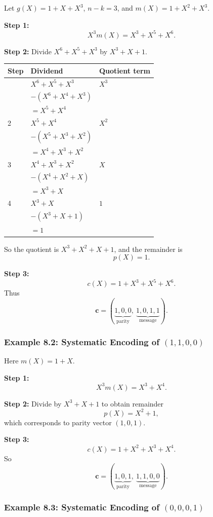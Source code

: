 \documentclass[
]{article}
\begin{document}
Let \(g(X)=1+X+X^3\), \(n-k=3\), and \(m(X)=1+X^2+X^3\).

\textbf{Step 1:} \[X^3m(X)=X^3+X^5+X^6.\]

\textbf{Step 2:} Divide \(X^6+X^5+X^3\) by \(X^3+X+1\).

\begin{longtable}[]{@{}lll@{}}
\toprule\noalign{}
Step & Dividend & Quotient term \\
\midrule\noalign{}
\endhead
\bottomrule\noalign{}
\endlastfoot
1 & \(X^6 + X^5 + X^3\) & \(X^3\) \\
& \(-(X^6 + X^4 + X^3)\) & \\
& \(= X^5 + X^4\) & \\
2 & \(X^5 + X^4\) & \(X^2\) \\
& \(-(X^5 + X^3 + X^2)\) & \\
& \(= X^4 + X^3 + X^2\) & \\
3 & \(X^4 + X^3 + X^2\) & \(X\) \\
& \(-(X^4 + X^2 + X)\) & \\
& \(= X^3 + X\) & \\
4 & \(X^3 + X\) & \(1\) \\
& \(-(X^3 + X + 1)\) & \\
& \(= 1\) & \\
\end{longtable}

So the quotient is \(X^3+X^2+X+1\), and the remainder is \[p(X)=1.\]

\textbf{Step 3:} \[c(X)=1+X^3+X^5+X^6.\] Thus
\[\mathbf{c}=(\underbrace{1,0,0}_{\text{parity}},\ \underbrace{1,0,1,1}_{\text{message}}).\]

\subsubsection{\texorpdfstring{Example 8.2: Systematic Encoding of
\((1,1,0,0)\)}{Example 8.2: Systematic Encoding of (1,1,0,0)}}\label{example-8.2-systematic-encoding-of-1100}

Here \(m(X)=1+X\).

\textbf{Step 1:} \[X^3m(X)=X^3+X^4.\]

\textbf{Step 2:} Divide by \(X^3+X+1\) to obtain remainder
\[p(X)=X^2+1,\] which corresponds to parity vector \((1,0,1)\).

\textbf{Step 3:} \[c(X)=1+X^2+X^3+X^4.\] So
\[\mathbf{c}=(\underbrace{1,0,1}_{\text{parity}},\ \underbrace{1,1,0,0}_{\text{message}}).\]

\subsubsection{\texorpdfstring{Example 8.3: Systematic Encoding of
\((0,0,0,1)\)}{Example 8.3: Systematic Encoding of (0,0,0,1)}}\label{example-8.3-systematic-encoding-of-0001}
\end{document}
